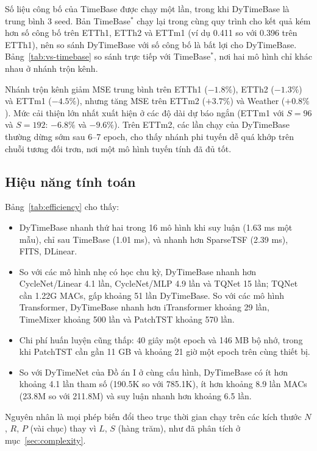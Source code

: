 \documentclass[12pt,a4paper]{report}
\numberwithin{equation}{chapter}
\begin{document}
Số liệu công bố của TimeBase được chạy một lần, trong khi DyTimeBase là trung bình 3 seed. Bản TimeBase$^{*}$ chạy lại
trong cùng quy trình cho kết quả kém hơn số công bố trên ETTh1, ETTh2 và ETTm1 (ví dụ 0.411 so với 0.396 trên ETTh1),
nên so sánh DyTimeBase với số công bố là bất lợi cho DyTimeBase. Bảng~\ref{tab:vs-timebase} so sánh trực tiếp với
TimeBase$^{*}$, nơi hai mô hình chỉ khác nhau ở nhánh trộn kênh.



Nhánh trộn kênh giảm MSE trung bình trên ETTh1 ($-1.8\%$), ETTh2 ($-1.3\%$) và ETTm1 ($-4.5\%$), nhưng tăng MSE trên
ETTm2 ($+3.7\%$) và Weather ($+0.8\%$). Mức cải thiện lớn nhất xuất hiện ở các độ dài dự báo ngắn (ETTm1 với $S=96$ và
$S=192$: $-6.8\%$ và $-9.6\%$). Trên ETTm2, các lần chạy của DyTimeBase thường dừng sớm sau 6--7 epoch, cho thấy nhánh
phi tuyến dễ quá khớp trên chuỗi tương đối trơn, nơi một mô hình tuyến tính đã đủ tốt.

\subsection{Hiệu năng tính toán}



Bảng~\ref{tab:efficiency} cho thấy:
\begin{itemize}
  \item DyTimeBase nhanh thứ hai trong 16 mô hình khi suy luận (1.63 ms một mẫu), chỉ sau TimeBase (1.01 ms), và nhanh
        hơn SparseTSF (2.39 ms), FITS, DLinear.
  \item So với các mô hình nhẹ có học chu kỳ, DyTimeBase nhanh hơn CycleNet/Linear 4.1 lần, CycleNet/MLP 4.9 lần và TQNet
        15 lần; TQNet cần 1.22G MACs, gấp khoảng 51 lần DyTimeBase. So với các mô hình Transformer, DyTimeBase nhanh hơn
        iTransformer khoảng 29 lần, TimeMixer khoảng 500 lần và PatchTST khoảng 570 lần.
  \item Chi phí huấn luyện cũng thấp: 40 giây một epoch và 146 MB bộ nhớ, trong khi PatchTST cần gần 11 GB và khoảng
        21 giờ một epoch trên cùng thiết bị.
  \item So với DyTimeNet của Đồ án I ở cùng cấu hình, DyTimeBase có ít hơn khoảng 4.1 lần tham số (190.5K so với 785.1K),
        ít hơn khoảng 8.9 lần MACs (23.8M so với 211.8M) và suy luận nhanh hơn khoảng 6.5 lần.
\end{itemize}
Nguyên nhân là mọi phép biến đổi theo trục thời gian chạy trên các kích thước $N$, $R$, $P$ (vài chục) thay vì $L$, $S$
(hàng trăm), như đã phân tích ở mục~\ref{sec:complexity}.
\end{document}
